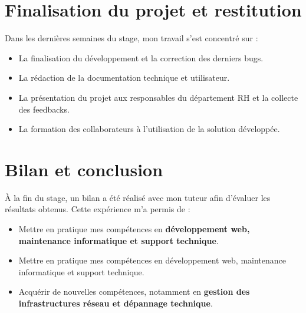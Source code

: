 \section{Finalisation du projet et restitution}
Dans les dernières semaines du stage, mon travail s’est concentré sur :

\begin{itemize}
    \item La finalisation du développement et la correction des derniers bugs.
    \item La rédaction de la documentation technique et utilisateur.
    \item La présentation du projet aux responsables du département RH et la collecte des feedbacks.
    \item La formation des collaborateurs à l’utilisation de la solution développée.

\end{itemize}
\section{Bilan et conclusion}
À la fin du stage, un bilan a été réalisé avec mon tuteur afin d’évaluer les résultats obtenus. Cette expérience m’a permis de :
\begin{itemize}
    \item Mettre en pratique mes compétences en \textbf{ développement web, maintenance informatique et support technique}.
    \item Mettre en pratique mes compétences en développement web, maintenance informatique et support technique.
    \item Acquérir de nouvelles compétences, notamment en \textbf{ gestion des infrastructures réseau et dépannage technique}.
\end{itemize}

\clearpage

